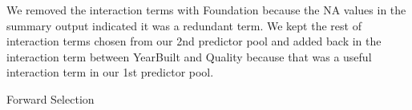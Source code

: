 \documentclass[
]{article}
\newenvironment{Shaded}{\begin{snugshade}}{\end{snugshade}}
\newcommand{\DataTypeTok}[1]{\textcolor[rgb]{0.13,0.29,0.53}{#1}}
\newcommand{\DecValTok}[1]{\textcolor[rgb]{0.00,0.00,0.81}{#1}}
\newcommand{\KeywordTok}[1]{\textcolor[rgb]{0.13,0.29,0.53}{\textbf{#1}}}
\newcommand{\NormalTok}[1]{#1}
\newcommand{\OperatorTok}[1]{\textcolor[rgb]{0.81,0.36,0.00}{\textbf{#1}}}
\newcommand{\OtherTok}[1]{\textcolor[rgb]{0.56,0.35,0.01}{#1}}
\newcommand{\StringTok}[1]{\textcolor[rgb]{0.31,0.60,0.02}{#1}}
\begin{document}
We removed the interaction terms with Foundation because the NA values
in the summary output indicated it was a redundant term. We kept the
rest of interaction terms chosen from our 2nd predictor pool and added
back in the interaction term between YearBuilt and Quality because that
was a useful interaction term in our 1st predictor pool.

Forward Selection

\begin{Shaded}
\end{Shaded}
\end{document}

